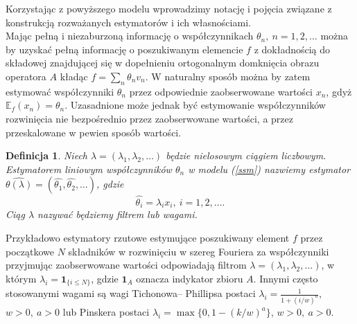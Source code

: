 \documentclass{article}
\newtheorem{df}{Definicja}
\begin{document}
Korzystając z powyższego modelu wprowadzimy notację i pojęcia związane z konstrukcją rozważanych estymatorów i ich własnościami.\\
Mając pełną i niezaburzoną informację o współczynnikach $\theta_n,\ n=1,2,\dots$ można by uzyskać pełną informację o poszukiwanym elemencie $f$ z dokładnością do składowej znajdującej się w dopełnieniu ortogonalnym domknięcia obrazu operatora $A$ kładąc $f=\sum_n\theta_nv_n$. W naturalny sposób można by zatem estymować współczynniki $\theta_n$ przez odpowiednie zaobserwowane wartości $x_n$, gdyż $\mathbb{E}_f(x_n)=\theta_n$. Uzasadnione może jednak być estymowanie współczynników rozwinięcia nie bezpośrednio przez zaobserwowane wartości, a przez przeskalowane w pewien sposób wartości. 
\begin{df}
Niech $\lambda=(\lambda_1,\lambda_2,\dots)$ będzie nielosowym ciągiem liczbowym. Estymatorem liniowym współczynników $\theta_n$ w modelu (\ref{ssm}) nazwiemy estymator $\hat{\theta(\lambda)}=(\hat{\theta_1},\hat{\theta_2},\dots)$, gdzie
\begin{displaymath}
\hat{\theta_i}=\lambda_ix_i,\ i=1,2,\dots.
\end{displaymath}
Ciąg $\lambda$ nazywać będziemy filtrem lub wagami.
\end{df}
Przykładowo estymatory rzutowe estymujące poszukiwany element $f$ przez początkowe $N$ składników w rozwinięciu w szereg Fouriera za współczynniki przyjmując zaobserwowane wartości odpowiadają filtrom $\lambda=(\lambda_1,\lambda_2,\dots)$, w którym $\lambda_i=\pmb{1}_{\{i\leq N\}}$, gdzie $\pmb{1}_A$ oznacza indykator zbioru $A$. Innymi często stosowanymi wagami są wagi Tichonowa-- Phillipsa postaci $\lambda_i=\frac{1}{1+(i/w)^a}$, $w>0,\ a>0$ lub Pinskera postaci $\lambda_i=\max\{0,1-(k/w)^a\}$, $w>0,\ a>0$. \\
\end{document}
